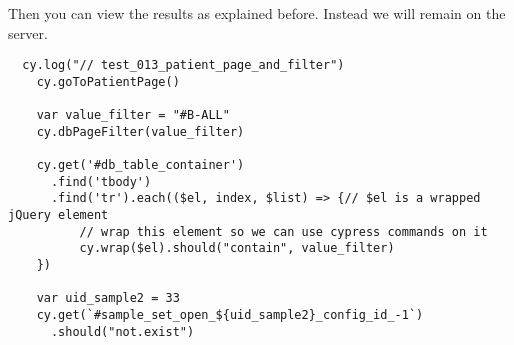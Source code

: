 Then you can view the results as explained before.
Instead we will remain on the server.

\begin{verbatim}
  cy.log("// test_013_patient_page_and_filter")
    cy.goToPatientPage()
  
    var value_filter = "#B-ALL"
    cy.dbPageFilter(value_filter)

    cy.get('#db_table_container')
      .find('tbody')
      .find('tr').each(($el, index, $list) => {// $el is a wrapped jQuery element
          // wrap this element so we can use cypress commands on it
          cy.wrap($el).should("contain", value_filter)
    })
    
    var uid_sample2 = 33
    cy.get(`#sample_set_open_${uid_sample2}_config_id_-1`)
      .should("not.exist")

\end{verbatim}

